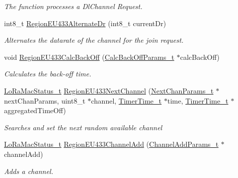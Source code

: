 \begin{DoxyCompactItemize}
\begin{DoxyCompactList}\small\item\em The function processes a Dl\+Channel Request. \end{DoxyCompactList}\item 
int8\+\_\+t \mbox{\hyperlink{group___r_e_g_i_o_n_e_u433_ga9c7cbfea2a1da97a1b4fa803eb3d92ce}{Region\+E\+U433\+Alternate\+Dr}} (int8\+\_\+t current\+Dr)
\begin{DoxyCompactList}\small\item\em Alternates the datarate of the channel for the join request. \end{DoxyCompactList}\item 
void \mbox{\hyperlink{group___r_e_g_i_o_n_e_u433_ga3e31558e030a1a2c27c26b8057c805e6}{Region\+E\+U433\+Calc\+Back\+Off}} (\mbox{\hyperlink{group___r_e_g_i_o_n_ga7c5c9a8da174e6679eded8257dc92fd9}{Calc\+Back\+Off\+Params\+\_\+t}} $\ast$calc\+Back\+Off)
\begin{DoxyCompactList}\small\item\em Calculates the back-\/off time. \end{DoxyCompactList}\item 
\mbox{\hyperlink{group___l_o_r_a_m_a_c_ga30bd25657e10480f8605ee951b0ecfbd}{Lo\+Ra\+Mac\+Status\+\_\+t}} \mbox{\hyperlink{group___r_e_g_i_o_n_e_u433_ga30cd7bdb36bb03824f3eb13ce0c84ee3}{Region\+E\+U433\+Next\+Channel}} (\mbox{\hyperlink{group___r_e_g_i_o_n_ga115f5e83afae352c0a3dcdc193374040}{Next\+Chan\+Params\+\_\+t}} $\ast$next\+Chan\+Params, uint8\+\_\+t $\ast$channel, \mbox{\hyperlink{utilities_8h_a4215ca43d3e953099ea758ce428599d0}{Timer\+Time\+\_\+t}} $\ast$time, \mbox{\hyperlink{utilities_8h_a4215ca43d3e953099ea758ce428599d0}{Timer\+Time\+\_\+t}} $\ast$aggregated\+Time\+Off)
\begin{DoxyCompactList}\small\item\em Searches and set the next random available channel \end{DoxyCompactList}\item 
\mbox{\hyperlink{group___l_o_r_a_m_a_c_ga30bd25657e10480f8605ee951b0ecfbd}{Lo\+Ra\+Mac\+Status\+\_\+t}} \mbox{\hyperlink{group___r_e_g_i_o_n_e_u433_ga477a869bd33f0fc4a1104e1a2097418a}{Region\+E\+U433\+Channel\+Add}} (\mbox{\hyperlink{group___r_e_g_i_o_n_gab1c5f3aa06614283202906cef4417860}{Channel\+Add\+Params\+\_\+t}} $\ast$channel\+Add)
\begin{DoxyCompactList}\small\item\em Adds a channel. \end{DoxyCompactList}\item 

\end{DoxyCompactItemize}
